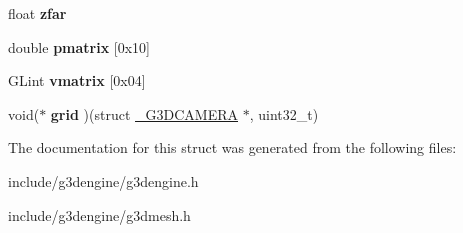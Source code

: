 \begin{DoxyCompactItemize}
float {\bfseries zfar}
\item 
\mbox{\label{struct__G3DCAMERA_af16a9cb38e1b51a46517ee34940d738c}} 
double {\bfseries pmatrix} \mbox{[}0x10\mbox{]}
\item 
\mbox{\label{struct__G3DCAMERA_a527f8f390490a6a74152f5f79af925ce}} 
G\+Lint {\bfseries vmatrix} \mbox{[}0x04\mbox{]}
\item 
\mbox{\label{struct__G3DCAMERA_ac7810eebaad00a4296a76ad9109732da}} 
void($\ast$ {\bfseries grid} )(struct \hyperlink{struct__G3DCAMERA}{\+\_\+\+G3\+D\+C\+A\+M\+E\+RA} $\ast$, uint32\+\_\+t)
\end{DoxyCompactItemize}


The documentation for this struct was generated from the following files\+:\begin{DoxyCompactItemize}
\item 
include/g3dengine/g3dengine.\+h\item 
include/g3dengine/g3dmesh.\+h\end{DoxyCompactItemize}

